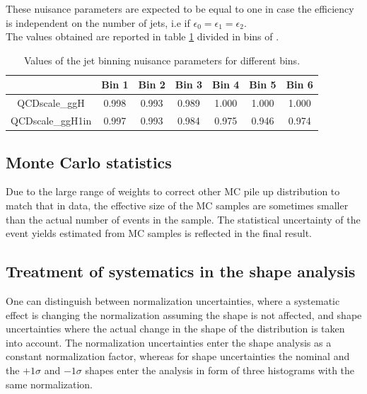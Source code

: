 These nuisance parameters are expected to be equal to one in case the efficiency is independent on the number of jets, i.e if $\epsilon_0 = \epsilon_1 = \epsilon_2$.\\
The values obtained are reported in table \ref{table:jet_binning_meas} divided in bins of \pth.

\begin{table}[h]
\caption{Values of the jet binning nuisance parameters for different \pth bins.}
\label{table:jet_binning_meas}
\begin{center}
\begin{tabular}{ccccccc}
& Bin 1 & Bin 2 & Bin 3 & Bin 4  & Bin 5 & Bin 6\\
\hline
QCDscale\_ggH  & 0.998  &   0.993  &   0.989  &   1.000  &   1.000   &  1.000 \\
QCDscale\_ggH1in &0.997   &  0.993  &   0.984  &   0.975 &    0.946 &    0.974  \\
\end{tabular}
\end{center}
\end{table}


\subsection{Monte Carlo statistics}

Due to the large range of weights to correct other MC pile up distribution to
match that in data, the effective size of the MC samples are sometimes smaller than
the actual number of events in the sample.
The statistical uncertainty of the event yields estimated from MC samples
is reflected in the final result.

\subsection{Treatment of systematics in the shape analysis}

One can distinguish between normalization uncertainties, where a systematic
effect is changing the normalization assuming the shape is not affected, and
shape uncertainties where the actual change in the shape of the distribution is
taken into account. The normalization uncertainties enter the shape analysis as
a constant normalization factor, whereas for shape uncertainties the nominal and
the $+1\sigma$ and $-1\sigma$ shapes enter the analysis in form of three histograms
with the same normalization. 

